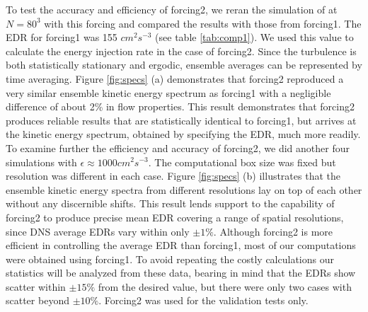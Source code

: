 To test the accuracy and efficiency of forcing2, we reran the simulation of \citet{Franklin2005} at $N=80^3$ with this forcing and compared the results with those from forcing1. The EDR for forcing1 was 155 $cm^2s^{-3}$ (see table \ref{tab:comp1}). We used this value to calculate the energy injection rate in the case of forcing2. Since the turbulence is both statistically stationary and ergodic, ensemble averages can be represented by time averaging.  Figure \ref{fig:specs} (a) demonstrates that forcing2 reproduced a very similar ensemble kinetic energy spectrum as forcing1 with a negligible difference of about 2\% in flow properties. This result demonstrates that forcing2 produces reliable results that are statistically identical to forcing1, but arrives at the kinetic energy spectrum, obtained by specifying the EDR, much more readily. To examine further the efficiency and accuracy of forcing2, we did another four simulations with $\epsilon \approx 1000 cm^2 s^{-3}$. The computational box size was fixed but resolution was different in each case. Figure \ref{fig:specs} (b) illustrates that the ensemble kinetic energy spectra from different resolutions lay on top of each other without any discernible shifts. This result lends support to the capability of forcing2 to produce precise mean EDR covering a range of spatial resolutions, since DNS average EDRs vary within only $\pm 1\%$. Although forcing2 is more efficient in controlling the average EDR than forcing1, most of our computations were obtained using forcing1. To avoid repeating the costly calculations our statistics will be analyzed from these data, bearing in mind that the EDRs show scatter within $\pm15\%$ from the desired value, but there were only two cases with scatter beyond $\pm10\%$. Forcing2 was used for the validation tests only.

